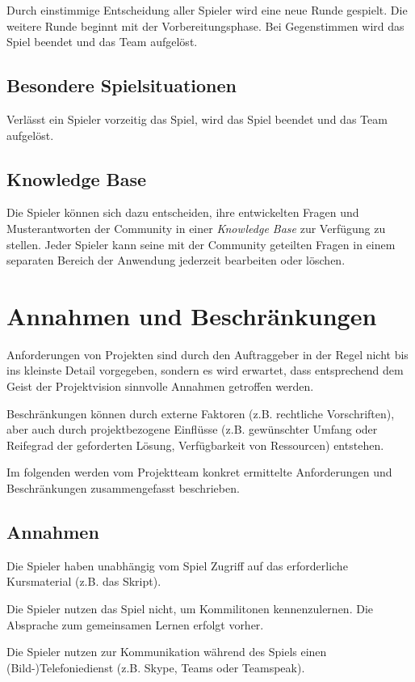 \documentclass[a4paper,11pt,listof=numbered,glossary=totoc,parskip=half,toc=bib]{scrreprt}
\begin{document}
Durch einstimmige Entscheidung aller Spieler wird eine neue Runde gespielt. Die weitere Runde beginnt mit der Vorbereitungsphase. Bei Gegenstimmen wird das Spiel beendet und das Team aufgelöst.

\subsection{Besondere Spielsituationen}

Verlässt ein Spieler vorzeitig das Spiel, wird das Spiel beendet und das Team aufgelöst.

\subsection{Knowledge Base}

Die Spieler können sich dazu entscheiden, ihre entwickelten Fragen und Musterantworten der Community in einer \textit{Knowledge Base} zur Verfügung zu stellen.
Jeder Spieler kann seine mit der Community geteilten Fragen in einem separaten Bereich der Anwendung jederzeit bearbeiten oder löschen.
	\newpage
	\section{Annahmen und Beschränkungen}
	Anforderungen von Projekten sind durch den Auftraggeber in der Regel nicht bis ins kleinste Detail vorgegeben, sondern es wird erwartet, dass entsprechend dem Geist der Projektvision sinnvolle Annahmen getroffen werden. 
	
	Beschränkungen können durch externe Faktoren (z.B. rechtliche Vorschriften), aber auch durch projektbezogene Einflüsse (z.B. gewünschter Umfang oder Reifegrad der geforderten Lösung, Verfügbarkeit von Ressourcen) entstehen.	
	
	Im folgenden werden vom Projektteam konkret ermittelte Anforderungen und Beschränkungen zusammengefasst beschrieben.
	
	\subsection{Annahmen}
Die Spieler haben unabhängig vom Spiel Zugriff auf das erforderliche Kursmaterial (z.B. das Skript).

Die Spieler nutzen das Spiel nicht, um Kommilitonen kennenzulernen. Die Absprache zum gemeinsamen Lernen erfolgt vorher.

Die Spieler nutzen zur Kommunikation während des Spiels einen (Bild-)Telefoniedienst (z.B. Skype, Teams oder Teamspeak).
\end{document}
